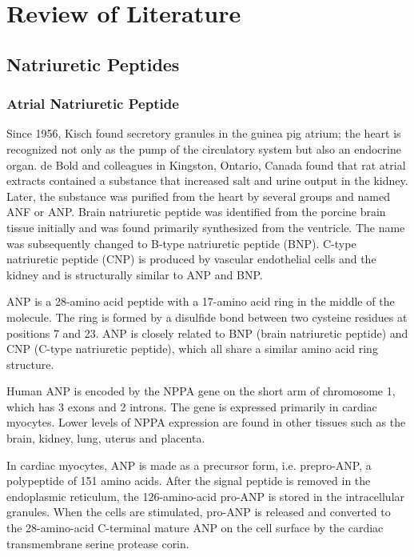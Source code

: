\documentclass[14pt,a4paper,onecolumn]{article}
\begin{document}
\section{Review of Literature}

\subsection{Natriuretic Peptides}


\subsubsection{Atrial Natriuretic Peptide}
Since 1956, Kisch found secretory granules in the guinea pig atrium; the heart is recognized not only as the pump of the circulatory system but also an endocrine organ.\citep{Kisch1956} \citep{deBold1979} de Bold and colleagues in Kingston, Ontario, Canada found that rat atrial extracts contained a substance that increased salt and urine output in the kidney.\citep{deBoldetal1981} Later, the substance was purified from the heart by several groups and named ANF or ANP.\citep{deBold1985}  Brain natriuretic peptide was identified from the porcine brain tissue initially and was found primarily synthesized from the ventricle. The name was subsequently changed to B-type natriuretic peptide (BNP). C-type natriuretic peptide (CNP) is produced by vascular endothelial cells and the kidney and is structurally similar to ANP and BNP.

ANP is a 28-amino acid peptide with a 17-amino acid ring in the middle of the molecule. The ring is formed by a disulfide bond between two cysteine residues at positions 7 and 23. ANP is closely related to BNP (brain natriuretic peptide) and CNP (C-type natriuretic peptide), which all share a similar amino acid ring structure.

Human ANP is encoded by the NPPA gene on the short arm of chromosome 1, which has 3 exons and 2 introns. The gene is expressed primarily in cardiac myocytes. Lower levels of NPPA expression are found in other tissues such as the brain, kidney, lung, uterus and placenta.

In cardiac myocytes, ANP is made as a precursor form, i.e. prepro-ANP, a polypeptide of 151 amino acids. After the signal peptide is removed in the endoplasmic reticulum, the 126-amino-acid pro-ANP is stored in the intracellular granules. When the cells are stimulated, pro-ANP is released and converted to the 28-amino-acid C-terminal mature ANP on the cell surface by the cardiac transmembrane serine protease corin.\citep{Yanetal1999}\citep{Yanetal2000}
\end{document}
